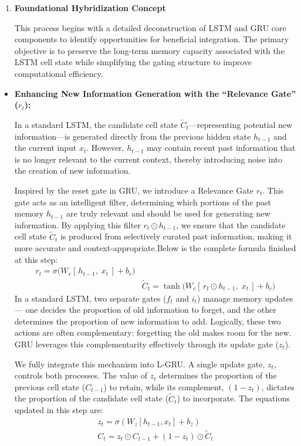 \documentclass{cys}
\begin{document}
\begin{enumerate}
  \item \textbf{Foundational Hybridization Concept}

  This process begins with a detailed deconstruction of LSTM and GRU core components to identify opportunities for beneficial integration. The primary objective is to preserve the long-term memory capacity associated with the LSTM cell state while simplifying the gating structure to improve computational efficiency.
\end{enumerate}
  \begin{itemize}
    \item \textbf{Enhancing New Information Generation with the ``Relevance Gate'' (\(r_t\)):}

  In a standard LSTM, the candidate cell state \(\tilde{C}_t\)---representing potential new information---is generated directly from the previous hidden state \(h_{t-1}\) and the current input \(x_t\). However, \(h_{t-1}\) may contain recent past information that is no longer relevant to the current context, thereby introducing noise into the creation of new information.

  Inspired by the reset gate in GRU, we introduce a Relevance Gate \(r_t\). This gate acts as an intelligent filter, determining which portions of the past memory \(h_{t-1}\) are truly relevant and should be used for generating new information. By applying this filter \(r_t \odot h_{t-1}\), we ensure that the candidate cell state \(\tilde{C}_t\) is produced from selectively curated past information, making it more accurate and context-appropriate.Below is the complete formula finished at this step:
    \begin{multline*}
  r_t = \sigma\!\big( W_r \left[\, h_{t-1},\; x_t \,\right] + b_r \big) \\&
  \tilde{C}_t = \tanh\!\big( W_c \left[\, r_t \odot h_{t-1},\; x_t \,\right] + b_c \big)
   \end{multline*}
   In a standard LSTM, two separate gates ($f_t$ and $i_t$) manage memory updates --- 
   one decides the proportion of old information to forget, and the other determines 
   the proportion of new information to add. Logically, these two actions are often 
   complementary: forgetting the old makes room for the new. GRU leverages this 
   complementarity effectively through its update gate ($z_t$).

   We fully integrate this mechanism into L-GRU. A single update gate, $z_t$, 
   controls both processes. The value of $z_t$ determines the proportion of the 
   previous cell state ($C_{t-1}$) to retain, while its complement, $(1 - z_t)$, 
   dictates the proportion of the candidate cell state ($\tilde{C}_t$) to incorporate. 
   The equations updated in this step are:
\begin{multline*}
    z_t = \sigma\left(W_z [h_{t-1}, x_t] + b_z\right) \\
    C_t = z_t \odot C_{t-1} + (1 - z_t) \odot \tilde{C}_t
\end{multline*}



\end{itemize}
\end{document}
